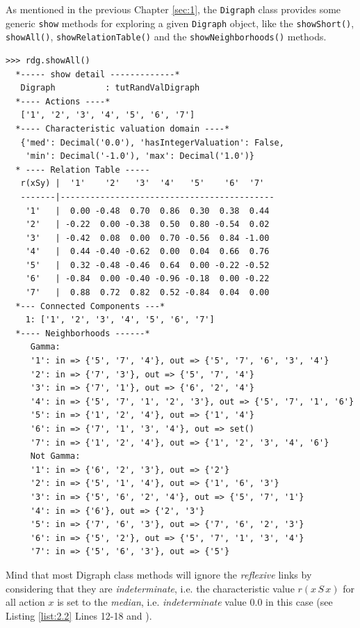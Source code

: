 As mentioned in the previous Chapter \ref{sec:1}, the {\tt Digraph} class provides some generic {\tt show} methods for exploring a given {\tt Digraph} object, like the {\tt showShort()}, {\tt showAll()}, {\tt showRelationTable()} and the {\tt showNeighborhoods()} methods.
\begin{lstlisting}[caption={Example of random valuation digraph},label=list:2.2]
>>> rdg.showAll()
  *----- show detail -------------*
   Digraph          : tutRandValDigraph
  *---- Actions ----*
   ['1', '2', '3', '4', '5', '6', '7']
  *---- Characteristic valuation domain ----*
   {'med': Decimal('0.0'), 'hasIntegerValuation': False, 
    'min': Decimal('-1.0'), 'max': Decimal('1.0')}
  * ---- Relation Table -----
   r(xSy) |  '1'    '2'   '3'  '4'   '5'    '6'  '7'	  
   -------|-------------------------------------------
    '1'   |  0.00 -0.48  0.70  0.86  0.30  0.38  0.44	 
    '2'   | -0.22  0.00 -0.38  0.50  0.80 -0.54  0.02	 
    '3'   | -0.42  0.08  0.00  0.70 -0.56  0.84 -1.00	 
    '4'   |  0.44 -0.40 -0.62  0.00  0.04  0.66  0.76	 
    '5'   |  0.32 -0.48 -0.46  0.64  0.00 -0.22 -0.52	 
    '6'   | -0.84  0.00 -0.40 -0.96 -0.18  0.00 -0.22	 
    '7'   |  0.88  0.72  0.82  0.52 -0.84  0.04  0.00
  *--- Connected Components ---*
    1: ['1', '2', '3', '4', '5', '6', '7']
  *---- Neighborhoods ------*
     Gamma:
     '1': in => {'5', '7', '4'}, out => {'5', '7', '6', '3', '4'}
     '2': in => {'7', '3'}, out => {'5', '7', '4'}
     '3': in => {'7', '1'}, out => {'6', '2', '4'}
     '4': in => {'5', '7', '1', '2', '3'}, out => {'5', '7', '1', '6'}
     '5': in => {'1', '2', '4'}, out => {'1', '4'}
     '6': in => {'7', '1', '3', '4'}, out => set()
     '7': in => {'1', '2', '4'}, out => {'1', '2', '3', '4', '6'}
     Not Gamma:
     '1': in => {'6', '2', '3'}, out => {'2'}
     '2': in => {'5', '1', '4'}, out => {'1', '6', '3'}
     '3': in => {'5', '6', '2', '4'}, out => {'5', '7', '1'}
     '4': in => {'6'}, out => {'2', '3'}
     '5': in => {'7', '6', '3'}, out => {'7', '6', '2', '3'}
     '6': in => {'5', '2'}, out => {'5', '7', '1', '3', '4'}
     '7': in => {'5', '6', '3'}, out => {'5'}
\end{lstlisting}   

Mind that most Digraph class methods will ignore the \emph{reflexive} links by considering that they are \emph{indeterminate}, i.e. the characteristic value $r(x\,S\,x)$ for all action $x$ is set to the \emph{median}, i.e. \emph{indeterminate} value $0.0$ in this case (see Listing \ref{list:2.2} Lines 12-18 and \citet{BIS-2004a}).

